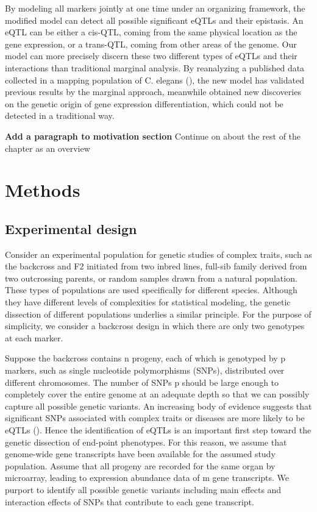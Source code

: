 \documentclass[11pt,]{book}
\theoremstyle{definition}
\theoremstyle{definition}
\theoremstyle{remark}
\begin{document}
By modeling all markers jointly at one time under an organizing
framework, the modified model can detect all possible significant eQTLs
and their epistasis. An eQTL can be either a cis-QTL, coming from the
same physical location as the gene expression, or a trans-QTL, coming
from other areas of the genome. Our model can more precisely discern
these two different types of eQTLs and their interactions than
traditional marginal analysis. By reanalyzing a published data collected
in a mapping population of C. elegans (\cite{rockman2010selection}), the
new model has validated previous results by the marginal approach,
meanwhile obtained new discoveries on the genetic origin of gene
expression differentiation, which could not be detected in a traditional
way.

\textbf{Add a paragraph to motivation section} Continue on about the
rest of the chapter as an overview

\section{Methods}\label{methods}

\subsection{Experimental design}\label{experimental-design}

Consider an experimental population for genetic studies of complex
traits, such as the backcross and F2 initiated from two inbred lines,
full-sib family derived from two outcrossing parents, or random samples
drawn from a natural population. These types of populations are used
specifically for different species. Although they have different levels
of complexities for statistical modeling, the genetic dissection of
different populations underlies a similar principle. For the purpose of
simplicity, we consider a backcross design in which there are only two
genotypes at each marker.

Suppose the backcross contains n progeny, each of which is genotyped by
p markers, such as single nucleotide polymorphisms (SNPs), distributed
over different chromosomes. The number of SNPs p should be large enough
to completely cover the entire genome at an adequate depth so that we
can possibly capture all possible genetic variants. An increasing body
of evidence suggests that significant SNPs associated with complex
traits or diseases are more likely to be eQTLs (\cite{li2013using}).
Hence the identification of eQTLs is an important first step toward the
genetic dissection of end-point phenotypes. For this reason, we assume
that genome-wide gene transcripts have been available for the assumed
study population. Assume that all progeny are recorded for the same
organ by microarray, leading to expression abundance data of m gene
transcripts. We purport to identify all possible genetic variants
including main effects and interaction effects of SNPs that contribute
to each gene transcript.
\end{document}
